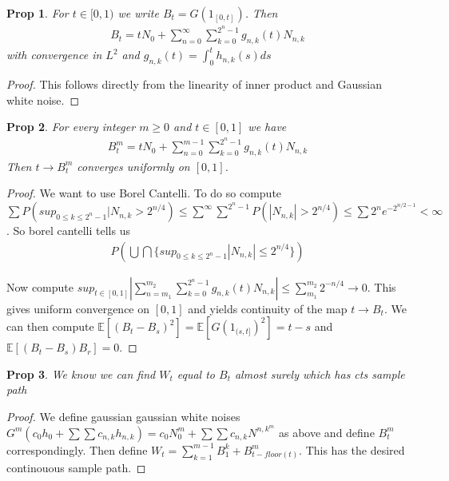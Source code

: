 \documentclass[11pt]{article}
\newcommand{\E}{\mathbb{E}}
\newtheorem{prop}{Prop}
\begin{document}
\begin{prop}
	For $t \in [0,1)$ we write $B_t = G(1_{[0,t]})$. Then
	\begin{align*}
		B_t = tN_0 + \sum_{n=0}^{\infty}\sum_{k=0}^{2^n-1}g_{n,k}(t)N_{n,k}
	\end{align*}
	with convergence in $L^2$ and $g_{n,k}(t) = \int_0^t h_{n,k}(s)ds$
\end{prop}

\begin{proof}
	This follows directly from the linearity of inner product and Gaussian white noise.
\end{proof}

\begin{prop}
	For every integer $m \geq 0$ and $t \in [0,1]$ we have
	\begin{align*}
		B_t^m = tN_0 + \sum_{n=0}^{m-1}\sum_{k=0}^{2^n-1} g_{n,k}(t) N_{n,k}
	\end{align*}
	Then $t \to B_t^m$ converges uniformly on $[0,1]$.
\end{prop}

\begin{proof}
	We want to use Borel Cantelli. To do so compute $\sum P(sup_{0 \leq k \leq 2^n-1}|N_{n,k} > 2^{n/4}) \leq \sum^{\infty} \sum^{2^n-1} P(|N_{n,k}| > 2^{n/4}) \leq \sum 2^n e^{-2^{n/2-1}} < \infty$. So borel cantelli tells us 
	\begin{align*}
		P(\bigcup \bigcap \{sup_{0 \leq k \leq 2^n-1} |N_{n,k}| \leq 2^{n/4}\})
	\end{align*}

	Now compute $sup_{t \in [0,1]} |\sum_{n=m_1}^{m_2}\sum_{k=0}^{2^n-1} g_{n,k}(t) N_{n,k}| \leq \sum_{m_1}^{m_2} 2^{-n/4} \to 0$. This gives uniform convergence on $[0,1]$ and yields continuity of the map $t \to B_t$. We can then compute $\E[(B_t - B_s)^2] = \E[G(1_{(s,t]})^2] = t-s$ and $\E[(B_t- B_s)B_r] = 0$. 
\end{proof}

\begin{prop}
	We know we can find $W_t$ equal to $B_t$ almost surely which has cts sample path
\end{prop}

\begin{proof}
	We define gaussian gaussian white noises $G^m(c_0h_0 + \sum\sum c_{n,k}h_{n,k}) = c_0N_0^m + \sum \sum c_{n,k}N^{n,k}^m$ as above and define $B_t^m$ correspondingly. Then define $W_t = \sum_{k=1}^{m-1} B_1^k + B^m_{t-floor(t)}$. This has the desired continouous sample path. 
\end{proof}
\end{document}
